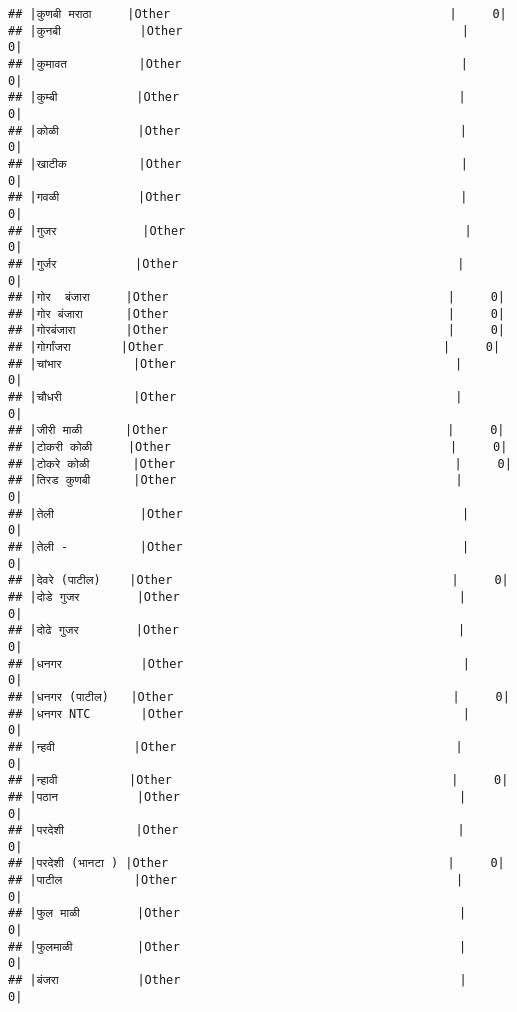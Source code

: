 \documentclass[
]{article}
\begin{document}
\begin{verbatim}
## |कुणबी मराठा     |Other                                       |     0|
## |कुनबी           |Other                                       |     0|
## |कुमावत          |Other                                       |     0|
## |कुम्बी           |Other                                       |     0|
## |कोळी           |Other                                       |     0|
## |खाटीक          |Other                                       |     0|
## |गवळी           |Other                                       |     0|
## |गुजर            |Other                                       |     0|
## |गुर्जर           |Other                                       |     0|
## |गोर  बंजारा     |Other                                       |     0|
## |गोर बंजारा      |Other                                       |     0|
## |गोरबंजारा       |Other                                       |     0|
## |गोर्गांजरा       |Other                                       |     0|
## |चांभार          |Other                                       |     0|
## |चौधरी          |Other                                       |     0|
## |जीरी माळी      |Other                                       |     0|
## |टोकरी कोळी     |Other                                       |     0|
## |टोकरे कोळी      |Other                                       |     0|
## |तिरड कुणबी      |Other                                       |     0|
## |तेली            |Other                                       |     0|
## |तेली -          |Other                                       |     0|
## |देवरे (पाटील)    |Other                                       |     0|
## |दोडे गुजर        |Other                                       |     0|
## |दोढे गुजर        |Other                                       |     0|
## |धनगर           |Other                                       |     0|
## |धनगर (पाटील)   |Other                                       |     0|
## |धनगर NTC       |Other                                       |     0|
## |न्हवी           |Other                                       |     0|
## |न्हावी          |Other                                       |     0|
## |पठान           |Other                                       |     0|
## |परदेशी          |Other                                       |     0|
## |परदेशी (भानटा ) |Other                                       |     0|
## |पाटील          |Other                                       |     0|
## |फुल माळी        |Other                                       |     0|
## |फुलमाळी         |Other                                       |     0|
## |बंजरा           |Other                                       |     0|

\end{verbatim}
\end{document}
